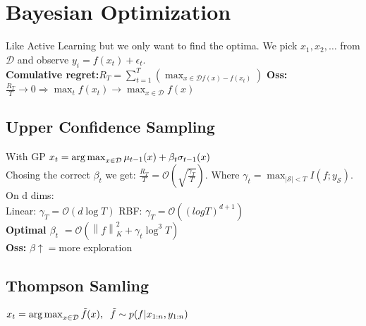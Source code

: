 \section{Bayesian Optimization}
Like Active Learning but we only want to find the optima. 
We pick $x_1, x_2, \dots$ from $\mathcal{D}$ and observe $y_i = f(x_t)+\epsilon_t$.\\
\textbf{Comulative regret:}$R_T=\sum\limits_{t=1}^T\left(\max_{x\in\mathcal{D}f(x) - f(x_t)}\right)$
\textbf{Oss:}$\frac{R_T}{T}\to 0 \Rightarrow \max_{t}f(x_t)\to \max_{x\in\mathcal{D}} f(x)$

\subsection{Upper Confidence Sampling}
With GP $x_t = \operatorname*{arg\,max}_{x\in \mathcal{D}} \mu_{t-1}(x) + \beta_t \sigma_{t-1}(x)$\\
Chosing the correct $\beta_t$ we get: $\frac{R_T}{T}=\mathcal{O}\left(\sqrt{\frac{\gamma_T}{T}}\right)$.
Where $\gamma_t = \max_{|\mathcal{S}|<T}I(f;y_\mathcal{S})$. On d dims:\\
{\scriptsize Linear}: $\gamma_T=\mathcal{O}(d\log T)$ {\scriptsize RBF}: $\gamma_T=\mathcal{O}((log T)^{d+1})$\\
\textbf{Optimal $\beta_t$} $=\mathcal{O}(\left\lVert f\right\rVert_K^2+\gamma_t \log^3T )$\\
\textbf{Oss:} $\beta \uparrow = $more exploration
\subsection{Thompson Samling}
$x_t = \operatorname*{arg\,max}_{x\in\mathcal{D}}\tilde{f}(x),\;\;\tilde{f}\sim p(f\vert x_{1:n}, y_{1:n})$

